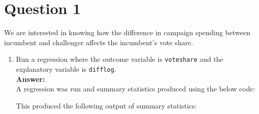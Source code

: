 \documentclass[12pt,letterpaper]{article}
\begin{document}
\section*{Question 1}
\vspace{.25cm}
\noindent We are interested in knowing how the difference in campaign spending between incumbent and challenger affects the incumbent's vote share. 
	\begin{enumerate}
		\item Run a regression where the outcome variable is \texttt{voteshare} and the explanatory variable is \texttt{difflog}.\\
		
		\textbf{Answer:}\\
		
		A regression was run and summary statistics produced using the below code:
		
		\vspace{.5cm}
		
		  
		
		\vspace{.5cm}
		
		This produced the following output of summary statistics:
		
		\vspace{.5cm}
		

\end{enumerate}
\end{document}
